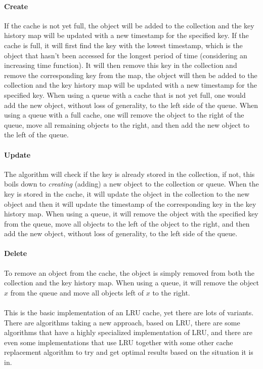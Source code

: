 \documentclass[pdftex,a4paper,12pt,twoside]{report}
\begin{document}
\paragraph{Create} If the cache is not yet full, the object will be added to the collection and the key history map will be updated with a new timestamp for the specified key. If the cache is full, it will first find the key with the lowest timestamp, which is the object that hasn't been accessed for the longest period of time (considering an increasing time function). It will then remove this key in the collection and remove the corresponding key from the map, the object will then be added to the collection and the key history map will be updated with a new timestamp for the specified key. When using a queue with a cache that is not yet full, one would add the new object, without loss of generality, to the left side of the queue. When using a queue with a full cache, one will remove the object to the right of the queue, move all remaining objects to the right, and then add the new object to the left of the queue.
\paragraph{Update} The algorithm will check if the key is already stored in the collection, if not, this boils down to \emph{creating} (adding) a new object to the collection or queue. When the key is stored in the cache, it will update the object in the collection to the new object and then it will update the timestamp of the corresponding key in the key history map. When using a queue, it will remove the object with the specified key from the queue, move all objects to the left of the object to the right, and then add the new object, without loss of generality, to the left side of the queue.
\paragraph{Delete} To remove an object from the cache, the object is simply removed from both the collection and the key history map. When using a queue, it will remove the object $x$ from the queue and move all objects left of $x$ to the right.
\\\\
\citep{lru_implementation}This is the basic implementation of an LRU cache, yet there are lots of variants. There are algorithms taking a new approach, based on LRU, there are some algorithms that have a highly specialized implementation of LRU, and there are even some implementations that use LRU together with some other cache replacement algorithm to try and get optimal results based on the situation it is in.
\end{document}
